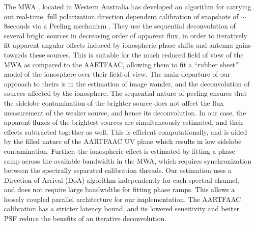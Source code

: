 \documentclass{aa}
\begin{document}
The  MWA   \citep{lonsdale2009murchison},  located  in   Western  Australia  has
developed an  algorithm for carrying out real-time,  full polarization direction
dependent  calibration of snapshots  of $\sim$8seconds  via a  Peeling mechanism
\citep{mitchell2008real}.   They  use the  sequential  deconvolution of  several
bright sources in decreasing order of apparent flux, in order to iteratively fit
apparent angular offsets  induced by ionospheric phase shifts  and antenna gains
towards these  sources. This is suitable for  the much reduced field  of view of
the MWA  as compared to  the AARTFAAC, allowing  them to fit a  ``rubber sheet''
model of  the ionosphere over  their field of  view.  The main departure  of our
approach to theirs  is in the estimation of image  wander, and the deconvolution
of sources affected by the ionosphere.  The sequential nature of peeling ensures
that the sidelobe contamination of the  brighter source does not affect the flux
measurement of the weaker source, and hence its deconvolution.  In our case, the
apparent fluxes of the brightest sources are simultaneously estimated, and their
effects subtracted together as well.   This is efficient computationally, and is
aided  by the  filled  nature of  the AARTFAAC  UV  plane which  results in  low
sidelobe contamination. Further, the  ionospheric effect is estimated by fitting
a  phase  ramp  across  the  available  bandwidth in  the  MWA,  which  requires
synchronization  between  the  spectrally  separated calibration  threads.   Our
estimation uses  a Direction of  Arrival (DoA) algorithm independently  for each
spectral channel, and does not require large bandwidths for fitting phase ramps.
This allows a loosely coupled parallel architecture for our implementation.  The
AARTFAAC calibration has  a stricter latency bound, and  its lowered sensitivity
and better PSF reduce the benefits of  an iterative deconvolution.
\end{document}
